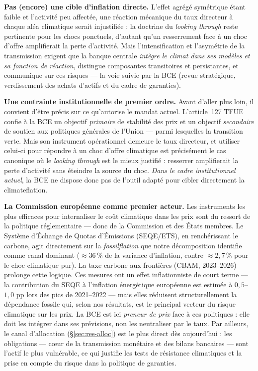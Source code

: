 \documentclass[11pt,a4paper]{article}
\begin{document}
\textbf{Pas (encore) une cible d'inflation directe.} L'effet agrégé symétrique étant faible
et l'activité peu affectée, une réaction mécanique du taux directeur à chaque aléa
climatique serait injustifiée : la doctrine du \emph{looking through} reste pertinente pour
les chocs ponctuels, d'autant qu'un resserrement face à un choc d'offre amplifierait la
perte d'activité. Mais l'intensification et l'asymétrie de la transmission exigent que la
banque centrale \emph{intègre le climat dans ses modèles et sa fonction de réaction},
distingue composantes transitoires et persistantes, et communique sur ces risques --- la
voie suivie par la BCE (revue stratégique, verdissement des achats d'actifs et du cadre de
garanties).

\textbf{Une contrainte institutionnelle de premier ordre.} Avant d'aller plus loin, il
convient d'être précis sur ce qu'autorise le mandat actuel. L'article~127 TFUE confie à la
BCE un objectif \emph{primaire} de stabilité des prix et un objectif \emph{secondaire} de
soutien aux politiques générales de l'Union --- parmi lesquelles la transition verte. Mais
son instrument opérationnel demeure le taux directeur, et utiliser celui-ci pour répondre à
un choc d'offre climatique est précisément le cas canonique où le \emph{looking through}
est le mieux justifié : resserrer amplifierait la perte d'activité sans éteindre la source
du choc. \emph{Dans le cadre institutionnel actuel}, la BCE ne dispose donc pas de l'outil
adapté pour cibler directement la climateflation.

\textbf{La Commission européenne comme premier acteur.} Les instruments les plus efficaces
pour internaliser le coût climatique dans les prix sont du ressort de la politique
réglementaire --- donc de la Commission et des États membres. Le Système d'Échange de
Quotas d'Émissions (SEQE/ETS), en renchérissant le carbone, agit directement sur la
\emph{fossilflation} que notre décomposition identifie comme canal dominant
($\approx 36\,\%$ de la variance d'inflation, contre $\approx 2{,}7\,\%$ pour le choc
climatique pur). La taxe carbone aux frontières (CBAM, 2023--2026) prolonge cette logique.
Ces mesures ont un effet inflationniste de court terme --- la contribution du SEQE à
l'inflation énergétique européenne est estimée à $0{,}5$--$1{,}0$ pp lors des pics de
2021--2022 --- mais elles réduisent structurellement la dépendance fossile qui, selon nos
résultats, est le principal vecteur du risque climatique sur les prix. La BCE est ici
\emph{preneur de prix} face à ces politiques : elle doit les intégrer dans ses prévisions,
non les neutraliser par le taux. Par ailleurs, le canal d'allocation (\S\ref{sec:res-alloc})
est le plus direct dès aujourd'hui : les obligations --- cœur de la transmission monétaire
et des bilans bancaires --- sont l'actif le plus vulnérable, ce qui justifie les tests de
résistance climatiques et la prise en compte du risque dans la politique de garanties.
\end{document}
